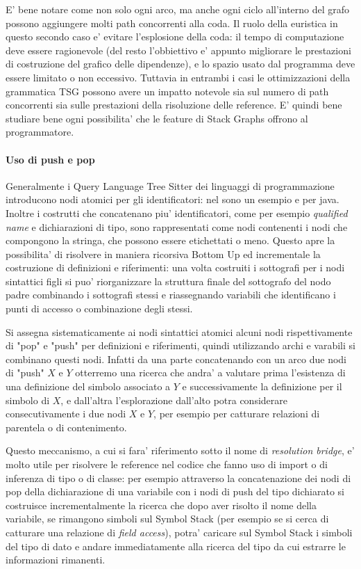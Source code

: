E' bene notare come non solo ogni arco, ma anche ogni ciclo all'interno del grafo possono aggiungere molti path concorrenti alla coda.
Il ruolo della euristica in questo secondo caso e' evitare l'esplosione della coda: il tempo di computazione deve essere ragionevole (del resto l'obbiettivo e' appunto migliorare le prestazioni di costruzione del grafico delle dipendenze), e lo spazio usato dal programma deve essere limitato o non eccessivo.
Tuttavia in entrambi i casi le ottimizzazioni della grammatica TSG possono avere un impatto notevole sia sul numero di path concorrenti sia sulle prestazioni della risoluzione delle reference. E' quindi bene studiare bene ogni possibilita' che le feature di Stack Graphs offrono al programmatore.

\paragraph{Uso di push e pop}

Generalmente i Query Language Tree Sitter dei linguaggi di programmazione introducono nodi atomici per gli identificatori: nel sono un esempio \emph{} e \emph{} per java.
Inoltre i costrutti che concatenano piu' identificatori, come per esempio \emph{qualified name} e dichiarazioni di tipo, sono rappresentati come nodi contenenti i nodi che compongono la stringa, che possono essere etichettati o meno.
Questo apre la possibilita' di risolvere in maniera ricorsiva Bottom Up ed incrementale la costruzione di definizioni e riferimenti: una volta costruiti i sottografi per i nodi sintattici figli si puo' riorganizzare la struttura finale del sottografo del nodo padre combinando i sottografi stessi e riassegnando variabili che identificano i punti di accesso o combinazione degli stessi.

Si assegna sistematicamente ai nodi sintattici atomici alcuni nodi rispettivamente di "pop" e "push" per definizioni e riferimenti, quindi utilizzando archi e varabili si combinano questi nodi.
Infatti da una parte concatenando con un arco due nodi di "push" $X$ e $Y$ otterremo una ricerca che andra' a valutare prima l'esistenza di una definizione del simbolo associato a $Y$ e successivamente la definizione per il simbolo di $X$, e dall'altra l'esplorazione dall'alto potra considerare consecutivamente i due nodi $X$ e $Y$, per esempio per catturare relazioni di parentela o di contenimento.

Questo meccanismo, a cui si fara' riferimento sotto il nome di \emph{resolution bridge}, e' molto utile per risolvere le reference nel codice che fanno uso di import o di inferenza di tipo o di classe: per esempio attraverso la concatenazione dei nodi di pop della dichiarazione di una variabile con i nodi di push del tipo dichiarato si costruisce incrementalmente la ricerca che dopo aver risolto il nome della variabile, se rimangono simboli sul Symbol Stack (per esempio se si cerca di catturare una relazione di \emph{field access}), potra' caricare sul Symbol Stack i simboli del tipo di dato e andare immediatamente alla ricerca del tipo da cui estrarre le informazioni rimanenti.


